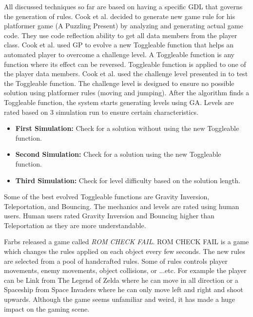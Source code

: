 All discussed techniques so far are based on having a specific GDL that governs the generation of rules. Cook et al.\cite{mechanicMiner} decided to generate new game rule for his platformer game (A Puzzling Present) by analyzing and generating actual game code. They use code reflection ability to get all data members from the player class. Cook et al. used GP to evolve a new Toggleable function that helps an automated player to overcome a challenge level. A Toggleable function is any function where its effect can be reversed. Toggleable function is applied to one of the player data members. Cook et al. used the challenge level presented in  to test the Toggleable function. The challenge level is designed to ensure no possible solution using platformer rules (moving and jumping). After the algorithm finds a Toggleable function, the system starts generating levels using GA. Levels are rated based on 3 simulation run to ensure certain characteristics.
\begin{itemize} \itemsep0pt \parskip0pt 
	\item \textbf{First Simulation:} Check for a solution without using the new Toggleable function.
	\item \textbf{Second Simulation:} Check for a solution using the new Toggleable function.
	\item \textbf{Third Simulation:} Check for level difficulty based on the solution length.
\end{itemize}
Some of the best evolved Toggleable functions are Gravity Inversion, Teleportation, and Bouncing. The mechanics and levels are rated using human users. Human users rated Gravity Inversion and Bouncing higher than Teleportation as they are more understandable.\\\par

Farbs released a game called \emph{ROM CHECK FAIL}\cite{romCheckFail}. ROM CHECK FAIL is a game which changes the rules applied on each object every few seconds. The new rules are selected from a pool of handcrafted rules. Some of rules controls player movements, enemy movements, object collisions, or ...etc. For example the player can be Link from The Legend of Zelda where he can move in all direction or a Spaceship from Space Invaders where he can only move left and right and shoot upwards. Although the game seems unfamiliar and weird, it has made a huge impact on the gaming scene.\\\par

